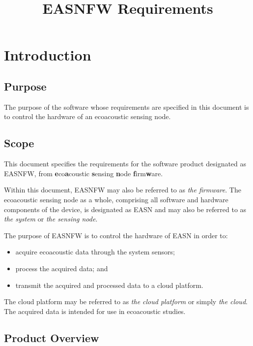 \documentclass[11pt,a4paper]{article}
\title{EASNFW Requirements}
\author{}
\date{}
\begin{document}
\maketitle

\tableofcontents
\clearpage

\section{Introduction}

\subsection{Purpose}

The purpose of the software whose requirements are specified in this document
is to control the hardware of an ecoacoustic sensing node.

\subsection{Scope}

This document specifies the requirements for the software product designated
as EASNFW, from \textbf{e}co\textbf{a}coustic \textbf{s}ensing \textbf{n}ode
\textbf{f}irm\textbf{w}are.

Within this document, EASNFW may also be referred to as \textit{the firmware}.
The ecoacoustic sensing node as a whole, comprising all software and hardware
components of the device, is designated as EASN and may also be referred to as
\textit{the system} or \textit{the sensing node}.

The purpose of EASNFW is to control the hardware of EASN in order to:

\begin{itemize}
    \item acquire ecoacoustic data through the system sensors;
    \item process the acquired data; and
    \item transmit the acquired and processed data to a cloud platform.
\end{itemize}

The cloud platform may be referred to as \textit{the cloud platform} or simply
\textit{the cloud}. The acquired data is intended for use in ecoacoustic
studies.

\subsection{Product Overview}
\end{document}
